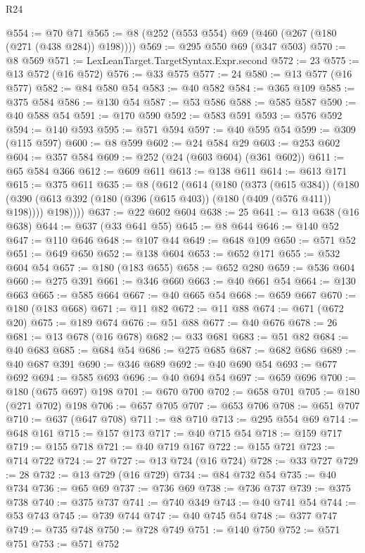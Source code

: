 \begin{lexlean}{R24}
\begin{coremodule}
@554 := @70 @71
@565 := @8 (@252 (@553 @554) @69 (@460 (@267 (@180 (@271 (@438 @284)) @198))))
@569 := @295 @550 @69 (@347 @503)
@570 := @8 @569
@571 := LexLeanTarget.TargetSyntax.Expr.second
@572 := 23
@575 := @13 @572 (@16 @572)
@576 := @33 @575
@577 := 24
@580 := @13 @577 (@16 @577)
@582 := @84 @580 @54
@583 := @40 @582
@584 := @365 @109
@585 := @375 @584
@586 := @130 @54
@587 := @53 @586
@588 := @585 @587
@590 := @40 @588 @54
@591 := @170 @590
@592 := @583 @591
@593 := @576 @592
@594 := @140 @593
@595 := @571 @594
@597 := @40 @595 @54
@599 := @309 (@115 @597)
@600 := @8 @599
@602 := @24 @584 @29
@603 := @253 @602
@604 := @357 @584
@609 := @252 (@24 (@603 @604) (@361 @602))
@611 := @65 @584 @366
@612 := @609 @611
@613 := @138 @611
@614 := @613 @171
@615 := @375 @611
@635 := @8
    (@612
      (@614
        (@180
          (@373 (@615 @384))
          (@180 (@390 (@613 @392 (@180 (@396 (@615 @403)) (@180 (@409 (@576 @411)) @198)))) @198))))
@637 := @22 @602 @604
@638 := 25
@641 := @13 @638 (@16 @638)
@644 := @637 (@33 @641 @55)
@645 := @8 @644
@646 := @140 @52
@647 := @110 @646
@648 := @107 @44
@649 := @648 @109
@650 := @571 @52
@651 := @649 @650
@652 := @138 @604
@653 := @652 @171
@655 := @532 @604 @54
@657 := @180 (@183 @655)
@658 := @652 @280
@659 := @536 @604
@660 := @275 @391
@661 := @346 @660
@663 := @40 @661 @54
@664 := @130 @663
@665 := @585 @664
@667 := @40 @665 @54
@668 := @659 @667
@670 := @180 (@183 @668)
@671 := @11 @82
@672 := @11 @88
@674 := @671 (@672 @20)
@675 := @189 @674
@676 := @51 @88
@677 := @40 @676
@678 := 26
@681 := @13 @678 (@16 @678)
@682 := @33 @681
@683 := @51 @82
@684 := @40 @683
@685 := @684 @54
@686 := @275 @685
@687 := @682 @686
@689 := @40 @687 @391
@690 := @346 @689
@692 := @40 @690 @54
@693 := @677 @692
@694 := @585 @693
@696 := @40 @694 @54
@697 := @659 @696
@700 := @180 (@675 @697) @198
@701 := @670 @700
@702 := @658 @701
@705 := @180 (@271 @702) @198
@706 := @657 @705
@707 := @653 @706
@708 := @651 @707
@710 := @637 (@647 @708)
@711 := @8 @710
@713 := @295 @554 @69
@714 := @648 @161
@715 := @157 @173
@717 := @40 @715 @54
@718 := @159 @717
@719 := @155 @718
@721 := @40 @719 @167
@722 := @155 @721
@723 := @714 @722
@724 := 27
@727 := @13 @724 (@16 @724)
@728 := @33 @727
@729 := 28
@732 := @13 @729 (@16 @729)
@734 := @84 @732 @54
@735 := @40 @734
@736 := @65 @69
@737 := @736 @69
@738 := @736 @737
@739 := @375 @738
@740 := @375 @737
@741 := @740 @349
@743 := @40 @741 @54
@744 := @53 @743
@745 := @739 @744
@747 := @40 @745 @54
@748 := @377 @747
@749 := @735 @748
@750 := @728 @749
@751 := @140 @750
@752 := @571 @751
@753 := @571 @752

\end{coremodule}
\end{lexlean}
